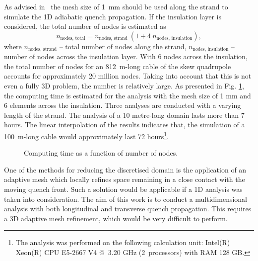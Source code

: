 As advised in~\cite[p.~40]{paudel_thesis} the mesh size of 1~mm should be used along the strand to simulate the 1D adiabatic quench propagation. If the insulation layer is considered, the total number of nodes is estimated as
\begin{equation}
    n_\text{nodes, total} = n_\text{nodes, strand}~(1+ 4~n_\text{nodes, insulation}),
    \label{eqn:tot_number_of_nodes}
\end{equation}
where $n_\text{nodes, strand}$ -- total number of nodes along the strand, $n_\text{nodes, insulation}$ -- number of nodes across the insulation layer. With 6 nodes across the insulation, the total number of nodes for an 812~m-long cable of the skew quadrupole accounts for approximately 20 million nodes. Taking into account that this is not even a fully 3D problem, the number is relatively large. As presented in Fig. \ref{fig: quench_propagation_conclusion_computing_time_estimation}, the computing time is estimated for the analysis with the mesh size of 1 mm and 6 elements across the insulation. Three analyses are conducted with a varying length of the strand. The analysis of a 10 metre-long domain lasts more than 7 hours. The linear interpolation of the results indicates that, the simulation of a 100~m-long cable would approximately last 72 hours\footnote{The analysis was performed on the following calculation unit: Intel(R) Xeon(R) CPU E5-2667 V4 @~3.20 GHz (2~processors) with RAM 128 GB.}.

\begin{figure}[H]
\centering
    \caption{Computing time as a function of number of nodes.}
    \label{fig: quench_propagation_conclusion_computing_time_estimation}
\end{figure}

One of the methods for reducing the discretised domain is the application of an adaptive mesh which locally refines space remaining in a close contact with the moving quench front. Such a solution would be applicable if a 1D analysis was taken into consideration. The aim of this work is to conduct a multidimensional analysis with both longitudinal and transverse quench propagation. This requires a 3D adaptive mesh refinement, which would be very difficult to perform.
